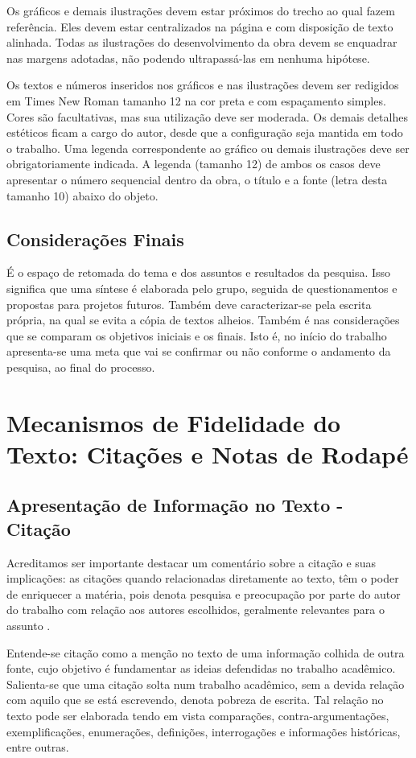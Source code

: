 \documentclass[
	12pt,				%
	openright,			%
	oneside,			%
	a4paper,			%
	english,			%
	french,				%
	spanish,			%
	brazil				%
	]{abntex2}
\begin{document}
\par Os gráficos e demais ilustrações devem estar próximos do trecho ao qual fazem referência. Eles devem estar centralizados na página e com disposição de texto alinhada. Todas as ilustrações do desenvolvimento da obra devem se enquadrar nas margens adotadas, não podendo ultrapassá-las em nenhuma hipótese. 
\par Os textos e números inseridos nos gráficos e nas ilustrações devem ser redigidos em Times New Roman tamanho 12 na cor preta e com espaçamento simples. Cores são facultativas, mas sua utilização deve ser moderada. Os demais detalhes estéticos ficam a cargo do autor, desde que a configuração seja mantida em todo o trabalho. Uma legenda correspondente ao gráfico ou demais ilustrações deve ser obrigatoriamente indicada. A legenda (tamanho 12) de ambos os casos deve apresentar o número sequencial dentro da obra, o título e a fonte (letra desta tamanho 10) abaixo do objeto.

\section{Considerações Finais}
\par É o espaço de retomada do tema e dos assuntos e resultados da pesquisa. Isso significa que uma síntese é elaborada pelo grupo, seguida de questionamentos e propostas para projetos futuros. Também deve caracterizar-se pela escrita própria, na qual se evita a cópia de textos alheios. Também é nas considerações que se comparam os objetivos iniciais e os finais. Isto é, no início do trabalho apresenta-se uma meta que vai se confirmar ou não conforme o andamento da pesquisa, ao final do processo.

\chapter{Mecanismos de Fidelidade do Texto: Citações e Notas de Rodapé}

\section{Apresentação de Informação no Texto - Citação}

\par Acreditamos ser importante destacar um comentário sobre a citação e suas implicações: as citações quando relacionadas diretamente ao texto, têm o poder de enriquecer a matéria, pois denota pesquisa e preocupação por parte do autor do trabalho com relação aos autores escolhidos, geralmente relevantes para o assunto \cite{Muller2003}.
\par Entende-se citação como a menção no texto de uma informação colhida de outra fonte, cujo objetivo é fundamentar as ideias defendidas no trabalho acadêmico. Salienta-se que uma citação solta num trabalho acadêmico, sem a devida relação com aquilo que se está escrevendo, denota pobreza de escrita. Tal relação no texto pode ser elaborada tendo em vista comparações, contra-argumentações, exemplificações, enumerações, definições, interrogações e informações históricas, entre outras.  
\end{document}
